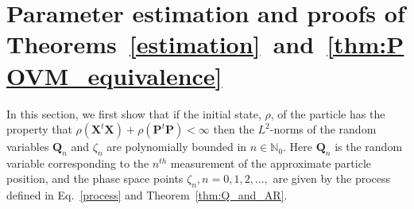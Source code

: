 \documentclass[11pt]{article}
\begin{document}
\section{Parameter estimation and proofs of \mbox{Theorems \ref{estimation} and \ref{thm:POVM_equivalence}}}\label{sec:proof_estim}

In this section, we first show that if the initial state, $\rho$, of the particle has the property that 
\mbox{$\rho(\mathbf X^t\mathbf X)+\rho(\mathbf P^t\mathbf P)<\infty$} then the $L^2$-norms of 
the random variables $\mathbf Q_n$ and $\zeta_n$ 
are polynomially bounded in $n \in \mathbb{N}_0$. Here $\mathbf Q_n$ is the random variable corresponding to the 
$n^{th}$ measurement of the approximate particle position, and the phase space points $\zeta_n, n=0,1,2,\dots,$ are 
given by the process defined in Eq.~\eqref{process} and Theorem~\ref{thm:Q_and_AR}.
\end{document}
